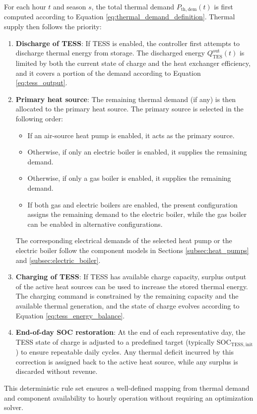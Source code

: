 \documentclass[12pt,a4paper]{report}
\begin{document}
For each hour \(t\) and season \(s\), the total thermal demand \(P_{\mathrm{th,dem}}(t)\) is first computed according to Equation \ref{eq:thermal_demand_definition}. Thermal supply then follows the priority:
\begin{enumerate}
    \item \textbf{Discharge of TESS}: If TESS is enabled, the controller first attempts to discharge thermal energy from storage. The discharged energy \(Q_{\mathrm{TES}}^{\mathrm{out}}(t)\) is limited by both the current state of charge and the heat exchanger efficiency, and it covers a portion of the demand according to Equation \ref{eq:tess_output}.
    \item \textbf{Primary heat source}: The remaining thermal demand (if any) is then allocated to the primary heat source. The primary source is selected in the following order:
    \begin{itemize}
        \item If an air-source heat pump is enabled, it acts as the primary source.
        \item Otherwise, if only an electric boiler is enabled, it supplies the remaining demand.
        \item Otherwise, if only a gas boiler is enabled, it supplies the remaining demand.
        \item If both gas and electric boilers are enabled, the present configuration assigns the remaining demand to the electric boiler, while the gas boiler can be enabled in alternative configurations.
    \end{itemize}
    The corresponding electrical demands of the selected heat pump or the electric boiler follow the component models in Sections \ref{subsec:heat_pumps} and \ref{subsec:electric_boiler}.
    \item \textbf{Charging of TESS}: If TESS has available charge capacity, surplus output of the active heat sources can be used to increase the stored thermal energy. The charging command is constrained by the remaining capacity and the available thermal generation, and the state of charge evolves according to Equation \ref{eq:tess_energy_balance}.
    \item \textbf{End-of-day SOC restoration}: At the end of each representative day, the TESS state of charge is adjusted to a predefined target (typically \(\mathrm{SOC}_{\mathrm{TESS,init}}\)) to ensure repeatable daily cycles. Any thermal deficit incurred by this correction is assigned back to the active heat source, while any surplus is discarded without revenue.
\end{enumerate}
This deterministic rule set ensures a well-defined mapping from thermal demand and component availability to hourly operation without requiring an optimization solver.
\end{document}
